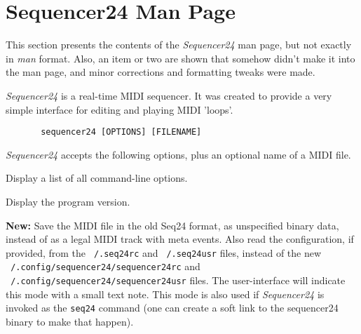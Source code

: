 %
%
%

\section{Sequencer24 Man Page}
\label{sec:seq24_man_page}

   This section presents the contents of the \textsl{Sequencer24} man page, but
   not exactly in \textsl{man} format.  Also, an item or two are shown that
   somehow didn't make it into the man page, and minor corrections and
   formatting tweaks were made.

   \textsl{Sequencer24} is a real-time MIDI sequencer. It was created to
   provide a very simple interface for editing and playing MIDI 'loops'.

   \begin{verbatim}
       sequencer24 [OPTIONS] [FILENAME]
   \end{verbatim}

   \textsl{Sequencer24} accepts the following options, plus an optional name of a
   MIDI file.

   \setcounter{ItemCounter}{0}      %

      Display a list of all command-line options.

      Display the program version.

      \textbf{New:}
      Save the MIDI file in the old Seq24 format, as unspecified
      binary data, instead of as a legal MIDI track with meta events.
      Also read the configuration, if provided, from the
      \texttt{~/.seq24rc} and \texttt{~/.seq24usr} files,
      instead of the new
      \texttt{~/.config/sequencer24/sequencer24rc} and
      \texttt{~/.config/sequencer24/sequencer24usr} files.
      The user-interface will indicate this mode with a small text
      note.
      This mode is also used if \textsl{Sequencer24} is invoked as the
      \texttt{seq24} command (one can create a soft link to the sequencer24
      binary to make that happen).

